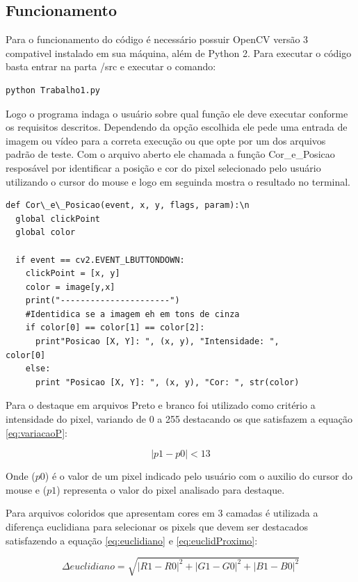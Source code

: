 \documentclass{bmvc2k}
\begin{document}
\subsection{Funcionamento}
Para o funcionamento do código é necessário possuir OpenCV versão 3 compativel instalado em sua máquina, além de Python 2.
Para executar o código basta entrar na parta /src e executar o comando:
\begin{lstlisting}
python Trabalho1.py
\end{lstlisting}
Logo o programa indaga o usuário sobre qual função ele deve executar conforme os requisitos descritos. Dependendo da opção escolhida ele pede uma entrada de imagem ou vídeo para a correta execução ou que opte por um dos arquivos padrão de teste.
Com o arquivo aberto ele chamada a função Cor\_e\_Posicao resposável por identificar a posição e cor do pixel selecionado pelo usuário utilizando o cursor do mouse e logo em seguinda mostra o resultado no terminal.

\begin{lstlisting}
def Cor\_e\_Posicao(event, x, y, flags, param):\n
  global clickPoint
  global color

  if event == cv2.EVENT_LBUTTONDOWN:
    clickPoint = [x, y]
    color = image[y,x]
    print("----------------------")		
    #Identidica se a imagem eh em tons de cinza
    if color[0] == color[1] == color[2]:
      print"Posicao [X, Y]: ", (x, y), "Intensidade: ",
color[0]
    else:
      print "Posicao [X, Y]: ", (x, y), "Cor: ", str(color)
\end{lstlisting}

Para o destaque em arquivos Preto e branco foi utilizado como critério a intensidade do pixel, variando de 0 a 255 destacando os que satisfazem a equação \ref{eq:variacaoP}:

\begin{equation}
\label{eq:variacaoP}	|p{1}-p{0}| < 13
\end{equation}

Onde ($p{0}$) é o valor de um pixel indicado pelo usuário com o auxilio do cursor do mouse e ($p{1}$) representa o valor do pixel analisado para destaque.

Para arquivos coloridos que apresentam cores em 3 camadas é utilizada a diferença euclidiana \cite{[DistanciaEuclidiana]} para selecionar os pixels que devem ser destacados satisfazendo a equação \ref{eq:euclidiano} e \ref{eq:euclidProximo}:

\begin{equation}
\label{eq:euclidiano}	
\Delta{euclidiano}=\sqrt{ |R{1}-R{0}|^2+|G{1}-G{0}|^2+|B{1}-B{0}|^2}
\end{equation}
\end{document}
